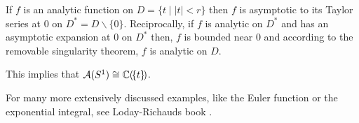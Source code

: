 \begin{exmp}
  If $f$ is an analytic function on $D=\{t\mid |t|<r\}$ then $f$ is asymptotic
  to its Taylor series at $0$ on $D^*=D\backslash\{0\}$.
  Reciprocally, if $f$ is analytic on $D^*$ and has an asymptotic expansion at
  $0$ on $D^*$ then, $f$ is bounded near $0$ and according to the removable
  singularity theorem, $f$ is analytic on $D$.
  \begin{s-rem}
    This implies that $\mathcal{A}(S^1)\cong\mathbb{C}(\!\{t\}\!)$.
  \end{s-rem}
\end{exmp}
For many more extensively discussed examples, like the Euler function or the
exponential integral, see Loday-Richauds book \cite[Sec.2.2]{Loday2014}.
\begin{comment}
  \begin{exmp}[Fundamental example: the Euler function]
    \marginnote{\cite[Exmp.2.2.4]{Loday2014}}
    Consider the Euler equation
    \begin{equation}
      x^2\frac{dy}{dx}+y=x \,.
    \end{equation}
    \TODO[]
  \end{exmp}
  \begin{exmp}[Classical example: the exponential integral]
    \marginnote{\cite[Exmp.2.2.5]{Loday2014}}
    Consider the exponential integral
    \begin{equation}
      Ei(x)=\int_x^{+\infty}e^{-t}\frac{dt}{t} \,.
    \end{equation}
    \TODO[]
  \end{exmp}
  \begin{exmp}[A generalized hypergeometric series ${}_3F_0$]
    \marginnote{\cite[Exmp.2.2.6]{Loday2014}}
    \TODO[]
  \end{exmp}
  \begin{exmp}[A series of a mild difference equation]
    \marginnote{\cite[Exmp.2.2.7]{Loday2014}}
    \TODO[]
  \end{exmp}
  \begin{exmp}[A series of a wild difference equation]
    \marginnote{\cite[Exmp.2.2.8]{Loday2014}}
    \TODO[]
  \end{exmp}
\end{comment}

